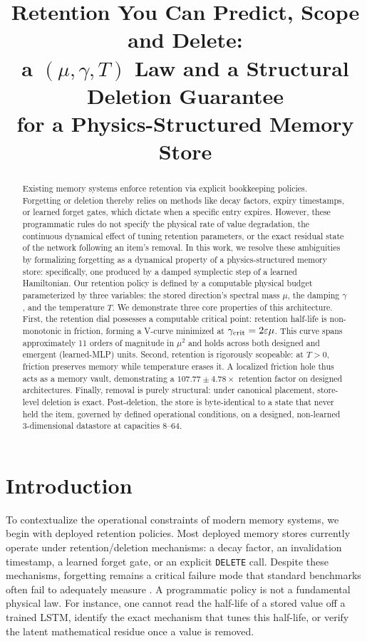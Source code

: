 \documentclass{article}
\title{Retention You Can Predict, Scope and Delete:\\ a $(\mu,\gamma,T)$ Law and a Structural Deletion Guarantee\\ for a Physics-Structured Memory Store}
\begin{document}
\maketitle
\begin{abstract}
Existing memory systems enforce retention via explicit bookkeeping policies. Forgetting or deletion thereby relies on methods like decay factors, expiry timestamps, or learned forget gates, which dictate when a specific entry expires.
However, these programmatic rules do not specify the physical rate of value degradation, the continuous dynamical effect of tuning retention parameters, or the exact residual state of the network following an item's removal.
In this work, we resolve these ambiguities by formalizing forgetting as a dynamical property of a physics-structured memory store: specifically, one produced by a damped symplectic step of a learned Hamiltonian. Our retention policy is defined by a computable physical budget parameterized by three variables: the stored direction's spectral mass $\mu$, the damping $\gamma$, and the temperature $T$. We demonstrate three core properties of this architecture. First, the retention dial possesses a computable critical point: retention half-life is non-monotonic in friction, forming a V-curve minimized at $\gamma_{\rm crit}=2\varepsilon\mu$. This curve spans approximately 11 orders of magnitude in $\mu^2$ and holds across both designed and emergent (learned-MLP) units. Second, retention is rigorously scopeable: at $T>0$, friction preserves memory while temperature erases it. A localized friction hole thus acts as a memory vault, demonstrating a $107.77\pm4.78\times$ retention factor on designed architectures. Finally, removal is purely structural: under canonical \citet{blelloch_strongly_2007} placement, store-level deletion is exact. Post-deletion, the store is byte-identical to a state that never held the item, governed by defined operational conditions, on a designed, non-learned 3-dimensional datastore at capacities 8--64.
\end{abstract}

\section{Introduction}\label{sec:intro}

To contextualize the operational constraints of modern memory systems, we begin with deployed retention policies. Most deployed memory stores currently operate under retention/deletion mechanisms: a decay factor, an invalidation timestamp, a learned forget gate, or an explicit \texttt{DELETE} call. Despite these mechanisms, forgetting remains a critical failure mode that standard benchmarks often fail to adequately measure \citep{yang_control-plane_2026,uddin_recall_2026}. A programmatic policy is not a fundamental physical law. For instance, one cannot read the half-life of a stored value off a trained LSTM, identify the exact mechanism that tunes this half-life, or verify the latent mathematical residue once a value is removed.
\end{document}
